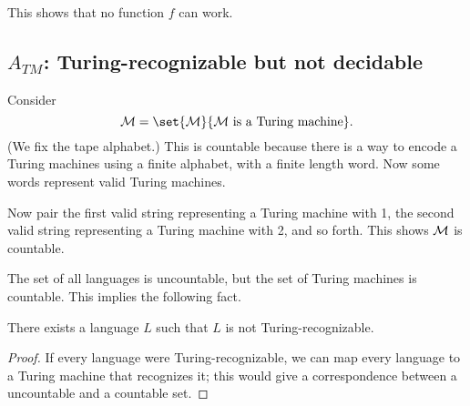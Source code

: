 This shows that no function $f$ can work.




\subsection{$A_{TM}$: Turing-recognizable but not decidable}
Consider
\[
\cal M=\set{M}{M\text{ is a Turing machine}}.
\]
(We fix the tape alphabet.)
This is countable because there is a way to encode a Turing machines using a finite alphabet, with a finite length word. Now some words represent valid Turing machines. %

Now pair the first valid string representing a Turing machine with 1, the second valid string representing a Turing machine with 2, and so forth. This shows $\cal M$ is countable.

The set of all languages is uncountable, but the set of Turing machines is countable. This implies the following fact.
\begin{thm}
There exists a language $L$ such that $L$ is not Turing-recognizable.
\end{thm}
\begin{proof}
If every language were Turing-recognizable, we can map every language to a Turing machine that recognizes it; this would give a correspondence between a uncountable and a countable set.
\end{proof}

